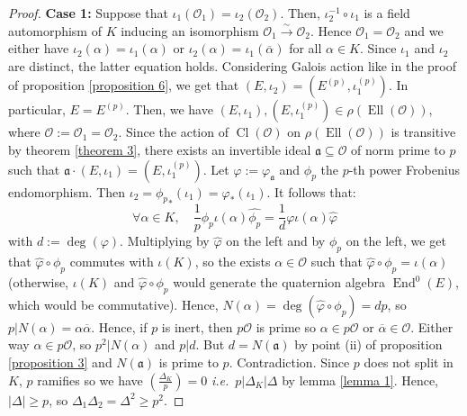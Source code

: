 \documentclass[a4paper,10pt]{report}
\theoremstyle{definition}
\theoremstyle{plain}
\theoremstyle{definition}
\newcommand{\ie}{\emph{i.e.}\ }
\newcommand{\mO}{\mathcal{O}}
\renewcommand{\(}{\left(}
\renewcommand{\)}{\right)}
\newcommand{\mf}[1]{\mathfrak{#1}}
\DeclareMathOperator{\End}{End}
\DeclareMathOperator{\Cl}{Cl}
\DeclareMathOperator{\Ell}{Ell}
\begin{document}
\begin{proof}
\textbf{Case 1:} Suppose that $\iota_1(\mO_1)=\iota_2(\mO_2)$. Then, $\iota_2^{-1}\circ\iota_1$ is a field automorphism of $K$ inducing an isomorphism $\mO_1\overset{\sim}{\longrightarrow}\mO_2$. Hence $\mO_1=\mO_2$ and we either have $\iota_2(\alpha)=\iota_1(\alpha)$ or $\iota_2(\alpha)=\iota_1(\overline{\alpha})$ for all $\alpha\in K$.  Since $\iota_1$ and $\iota_2$ are distinct, the latter equation holds. Considering Galois action like in the proof of proposition \ref{proposition 6}, we get that $(E,\iota_2)=(E^{(p)},\iota_1^{(p)})$. In particular, $E=E^{(p)}$. Then, we have $(E,\iota_1),(E,\iota_1^{(p)})\in\rho(\Ell(\mO))$, where $\mO:=\mO_1=\mO_2$. Since the action of $\Cl(\mO)$ on $\rho(\Ell(\mO))$ is transitive by theorem \ref{theorem 3}, there exists an invertible ideal $\mf{a}\subseteq\mO$ of norm prime to $p$ such that $\mf{a}\cdot(E,\iota_1)=(E,\iota_1^{(p)})$.  Let $\varphi:=\varphi_{\mf{a}}$ and $\phi_p$ the $p$-th power Frobenius endomorphism. Then $\iota_2={\phi_p}_*(\iota_1)=\varphi_*(\iota_1)$. It follows that:
\[\forall\alpha\in K, \quad \frac{1}{p}\phi_p\iota(\alpha)\widehat{\phi_p}=\frac{1}{d}\varphi\iota(\alpha)\widehat{\varphi}\]
with $d:=\deg(\varphi)$. Multiplying by $\widehat{\varphi}$ on the left and by $\phi_p$ on the left, we get that $\widehat{\varphi}\circ\phi_p$ commutes with $\iota(K)$, so the exists $\alpha\in\mO$ such that $\widehat{\varphi}\circ\phi_p=\iota(\alpha)$ (otherwise, $\iota(K)$ and $\widehat{\varphi}\circ\phi_p$ would generate the quaternion algebra $\End^0(E)$, which would be commutative). Hence, $N(\alpha)=\deg(\widehat{\varphi}\circ\phi_p)=dp$, so $p|N(\alpha)=\alpha\overline{\alpha}$. Hence, if $p$ is inert, then $p\mO$ is prime so $\alpha\in p\mO$ or $\overline{\alpha}\in\mO$. Either way $\alpha\in p\mO$, so $p^2|N(\alpha)$ and $p|d$. But $d=N(\mf{a})$ by point (ii) of proposition \ref{proposition 3} and $N(\mf{a})$ is prime to $p$. Contradiction. Since $p$ does not split in $K$, $p$ ramifies so we have $\(\frac{\Delta_K}{p}\)=0$ \ie $p|\Delta_K|\Delta$ by lemma \ref{lemma 1}.  Hence, $|\Delta|\geq p$, so $\Delta_1\Delta_2=\Delta^2\geq p^2$.


\end{proof}
\end{document}
